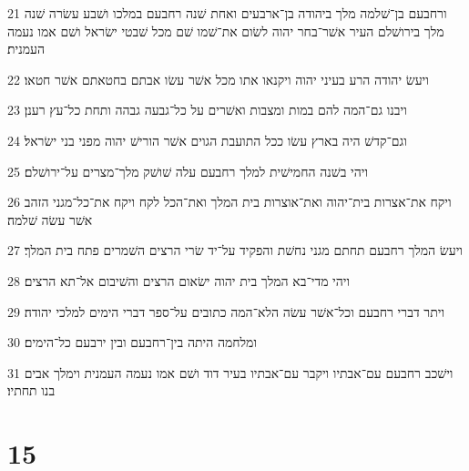 \par 21 ורחבעם בן־שׁלמה מלך ביהודה בן־ארבעים ואחת שׁנה רחבעם במלכו ושׁבע עשׂרה שׁנה מלך בירושׁלם העיר אשׁר־בחר יהוה לשׂום את־שׁמו שׁם מכל שׁבטי ישׂראל ושׁם אמו נעמה העמנית׃
\par 22 ויעשׂ יהודה הרע בעיני יהוה ויקנאו אתו מכל אשׁר עשׂו אבתם בחטאתם אשׁר חטאו׃
\par 23 ויבנו גם־המה להם במות ומצבות ואשׁרים על כל־גבעה גבהה ותחת כל־עץ רענן׃
\par 24 וגם־קדשׁ היה בארץ עשׂו ככל התועבת הגוים אשׁר הורישׁ יהוה מפני בני ישׂראל׃
\par 25 ויהי בשׁנה החמישׁית למלך רחבעם עלה שׁושׁק מלך־מצרים על־ירושׁלם׃
\par 26 ויקח את־אצרות בית־יהוה ואת־אוצרות בית המלך ואת־הכל לקח ויקח את־כל־מגני הזהב אשׁר עשׂה שׁלמה׃
\par 27 ויעשׂ המלך רחבעם תחתם מגני נחשׁת והפקיד על־יד שׂרי הרצים השׁמרים פתח בית המלך׃
\par 28 ויהי מדי־בא המלך בית יהוה ישׂאום הרצים והשׁיבום אל־תא הרצים׃
\par 29 ויתר דברי רחבעם וכל־אשׁר עשׂה הלא־המה כתובים על־ספר דברי הימים למלכי יהודה׃
\par 30 ומלחמה היתה בין־רחבעם ובין ירבעם כל־הימים׃
\par 31 וישׁכב רחבעם עם־אבתיו ויקבר עם־אבתיו בעיר דוד ושׁם אמו נעמה העמנית וימלך אבים בנו תחתיו׃

\chapter{15}


